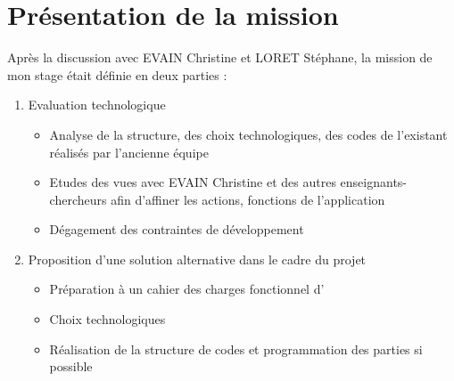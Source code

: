 \section{Présentation de la mission}

Après la discussion avec EVAIN Christine et LORET Stéphane, la mission de mon stage était définie en deux parties :

\begin{enumerate}
    \item Evaluation technologique
    \begin{itemize}
        \item Analyse de la structure, des choix technologiques, des codes de l'existant réalisés par l'ancienne équipe
        \item Etudes des vues avec EVAIN Christine et des autres enseignants-chercheurs afin d'affiner les actions, fonctions de l'application
        \item Dégagement des contraintes de développement
    \end{itemize}    
    \item Proposition d'une solution alternative dans le cadre du projet \ezb\
    \begin{itemize}
        \item Préparation à un cahier des charges fonctionnel d'\ezb\
        \item Choix technologiques 
        \item Réalisation de la structure de codes et programmation des parties si possible
    \end{itemize}
\end{enumerate}